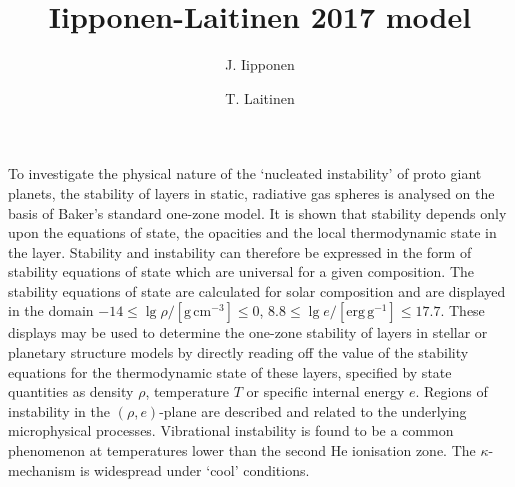 \documentclass[referee,a4paper,12pt,traditabstract]{swsc}
\begin{document}
\begin{linenumbers}

   \title{Iipponen-Laitinen 2017 model}

   


   \author{J. Iipponen
          \and
          T. Laitinen\fnmsep
          }



 
  \abstract
   {To investigate the physical nature of the `nuc\-leated instability' of
   proto giant planets, the stability of layers
   in static, radiative gas spheres is analysed on the basis of Baker's
   standard one-zone model.
   It is shown that stability
   depends only upon the equations of state, the opacities and the local
   thermodynamic state in the layer. Stability and instability can
   therefore be expressed in the form of stability equations of state
   which are universal for a given composition.
   The stability equations of state are
   calculated for solar composition and are displayed in the domain
   $-14 \leq \lg \rho / \mathrm{[g\, cm^{-3}]} \leq 0 $,
   $ 8.8 \leq \lg e / \mathrm{[erg\, g^{-1}]} \leq 17.7$. These displays
   may be used to determine the one-zone stability of layers in stellar
   or planetary structure models by directly reading off the value of
   the stability equations for the thermodynamic state of these layers,
   specified by state quantities as density $\rho$, temperature $T$ or
   specific internal energy $e$.
   Regions of instability in the $(\rho,e)$-plane are described
   and related to the underlying microphysical processes.
   Vibrational instability is found to be a common phenomenon
   at temperatures lower than the second He ionisation
   zone. The $\kappa$-mechanism is widespread under `cool'
   conditions.
   }        %
   


\end{linenumbers}
\end{document}
